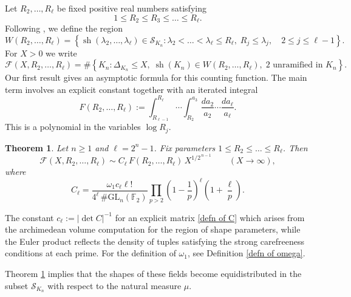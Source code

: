 \documentclass{amsart}
\newcommand{\F}{\mathbb{F}}
\newcommand{\op}[1]{\operatorname{#1}}
\newcommand{\GL}{\mathrm{GL}}
\theoremstyle{plain}
\newtheorem{theorem}{Theorem}[section]
\theoremstyle{definition}
\theoremstyle{remark}
\numberwithin{equation}{section}
\begin{document}
Let $R_2,\dots,R_\ell$ be fixed positive real numbers satisfying
\[
1\le R_2\le R_3\le\dots\le R_\ell .
\]
Following \cite{Hassan}, we define the region
\[
W(R_2,\dots,R_\ell)
=
\left\{
\operatorname{sh}(\lambda_2,\dots,\lambda_\ell)\in\mathcal{S}_{K_n}
:
\lambda_2<\dots<\lambda_\ell\le R_\ell,\;
R_j\le\lambda_j,\quad 2\le j\le\ell-1
\right\}.
\]
For $X>0$ we write
\[
\mathcal{F}(X,R_2,\dots,R_\ell)
=
\#\left\{
K_n :
\Delta_{K_n}\le X,\;
\operatorname{sh}(K_n)\in W(R_2,\dots,R_\ell),\;
2 \text{ unramified in } K_n
\right\}.
\]
\noindent Our first result gives an asymptotic formula for this counting
function.  The main term involves an explicit constant together with an iterated integral
\[
F(R_2,\dots,R_\ell):=\int_{R_{\ell-1}}^{R_\ell}
\!\!\cdots
\int_{R_2}^{a_3}
\frac{da_2}{a_2}\cdots\frac{da_\ell}{a_\ell}.
\]
This is a polynomial in the variables $\log R_j$.

\begin{theorem}\label{thm:main-intro}
Let $n\ge1$ and $\ell=2^n-1$.  Fix parameters
$1\le R_2\le\dots\le R_\ell$.  Then
\[
\mathcal{F}(X,R_2,\dots,R_\ell)
\sim
C_\ell\,
F(R_2,\dots,R_\ell)\,
X^{1/2^{\,n-1}}
\qquad (X\to\infty),
\]
where
\[
C_\ell=
\frac{\omega_1 c_\ell\ell !}{4^\ell\,\#\GL_n(\F_2)}
\prod_{p>2}
\left(1-\frac1p\right)^\ell
\left(1+\frac{\ell}{p}\right).
\]
\end{theorem}

The constant $c_\ell:=|\op{det} C|^{-1}$ for an explicit matrix \eqref{defn of C} which arises from the archimedean volume computation
for the region of shape parameters, while the Euler product reflects
the density of tuples satisfying the strong carefreeness conditions at
each prime. For the definition of $\omega_1$, see Definition \ref{defn of omega}.

Theorem \ref{thm:main-intro} implies that the shapes of these fields
become equidistributed in the subset $\mathcal{S}_{K_n}$ with respect
to the natural measure $\mu$.
\end{document}

